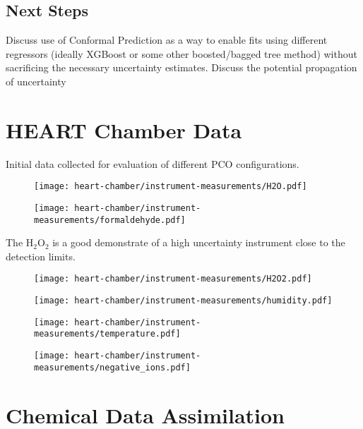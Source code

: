 \subsection{Next Steps}

Discuss use of Conformal Prediction as a way to enable fits using different regressors (ideally XGBoost or some other boosted/bagged tree method) without sacrificing the necessary uncertainty estimates. Discuss the potential propagation of uncertainty


\section{HEART Chamber Data}

Initial data collected for evaluation of different PCO configurations.

\begin{figure}[h]
  \centering
  \texttt{[image: heart-chamber/instrument-measurements/H2O.pdf]}
\end{figure}

\begin{figure}[h]
  \centering
  \texttt{[image: heart-chamber/instrument-measurements/formaldehyde.pdf]}
\end{figure}


The $\mathrm{H_2O_2}$ is a good demonstrate of a high uncertainty instrument close to the detection limits.
\begin{figure}[h]
  \centering
  \texttt{[image: heart-chamber/instrument-measurements/H2O2.pdf]}
\end{figure}

\begin{figure}[h]
  \centering
  \texttt{[image: heart-chamber/instrument-measurements/humidity.pdf]}
\end{figure}

\begin{figure}[h]
  \centering
  \texttt{[image: heart-chamber/instrument-measurements/temperature.pdf]}
\end{figure}

\begin{figure}[h]
  \centering
  \texttt{[image: heart-chamber/instrument-measurements/negative\_ions.pdf]}
\end{figure}


\section{Chemical Data Assimilation}

